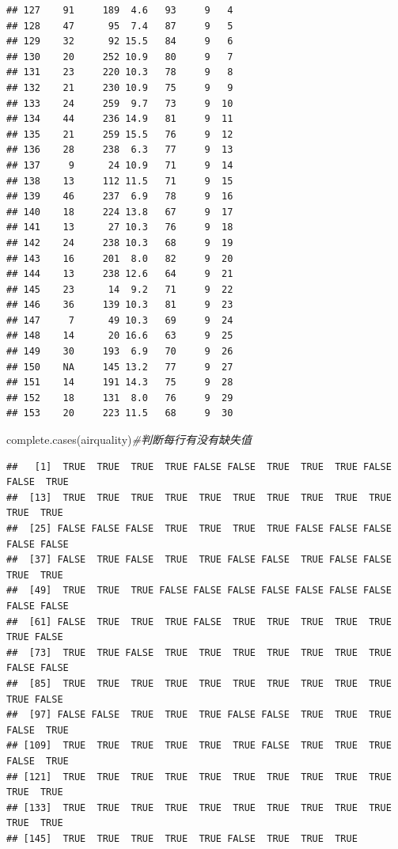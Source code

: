 \documentclass[
]{book}
\newenvironment{Shaded}{\begin{snugshade}}{\end{snugshade}}
\newcommand{\CommentTok}[1]{\textcolor[rgb]{0.56,0.35,0.01}{\textit{#1}}}
\newcommand{\FunctionTok}[1]{\textcolor[rgb]{0.00,0.00,0.00}{#1}}
\newcommand{\NormalTok}[1]{#1}
\begin{document}
\begin{verbatim}
## 127    91     189  4.6   93     9   4
## 128    47      95  7.4   87     9   5
## 129    32      92 15.5   84     9   6
## 130    20     252 10.9   80     9   7
## 131    23     220 10.3   78     9   8
## 132    21     230 10.9   75     9   9
## 133    24     259  9.7   73     9  10
## 134    44     236 14.9   81     9  11
## 135    21     259 15.5   76     9  12
## 136    28     238  6.3   77     9  13
## 137     9      24 10.9   71     9  14
## 138    13     112 11.5   71     9  15
## 139    46     237  6.9   78     9  16
## 140    18     224 13.8   67     9  17
## 141    13      27 10.3   76     9  18
## 142    24     238 10.3   68     9  19
## 143    16     201  8.0   82     9  20
## 144    13     238 12.6   64     9  21
## 145    23      14  9.2   71     9  22
## 146    36     139 10.3   81     9  23
## 147     7      49 10.3   69     9  24
## 148    14      20 16.6   63     9  25
## 149    30     193  6.9   70     9  26
## 150    NA     145 13.2   77     9  27
## 151    14     191 14.3   75     9  28
## 152    18     131  8.0   76     9  29
## 153    20     223 11.5   68     9  30
\end{verbatim}

\begin{Shaded}
\begin{Highlighting}[]
\FunctionTok{complete.cases}\NormalTok{(airquality)}\CommentTok{\#判断每行有没有缺失值}
\end{Highlighting}
\end{Shaded}

\begin{verbatim}
##   [1]  TRUE  TRUE  TRUE  TRUE FALSE FALSE  TRUE  TRUE  TRUE FALSE FALSE  TRUE
##  [13]  TRUE  TRUE  TRUE  TRUE  TRUE  TRUE  TRUE  TRUE  TRUE  TRUE  TRUE  TRUE
##  [25] FALSE FALSE FALSE  TRUE  TRUE  TRUE  TRUE FALSE FALSE FALSE FALSE FALSE
##  [37] FALSE  TRUE FALSE  TRUE  TRUE FALSE FALSE  TRUE FALSE FALSE  TRUE  TRUE
##  [49]  TRUE  TRUE  TRUE FALSE FALSE FALSE FALSE FALSE FALSE FALSE FALSE FALSE
##  [61] FALSE  TRUE  TRUE  TRUE FALSE  TRUE  TRUE  TRUE  TRUE  TRUE  TRUE FALSE
##  [73]  TRUE  TRUE FALSE  TRUE  TRUE  TRUE  TRUE  TRUE  TRUE  TRUE FALSE FALSE
##  [85]  TRUE  TRUE  TRUE  TRUE  TRUE  TRUE  TRUE  TRUE  TRUE  TRUE  TRUE FALSE
##  [97] FALSE FALSE  TRUE  TRUE  TRUE FALSE FALSE  TRUE  TRUE  TRUE FALSE  TRUE
## [109]  TRUE  TRUE  TRUE  TRUE  TRUE  TRUE FALSE  TRUE  TRUE  TRUE FALSE  TRUE
## [121]  TRUE  TRUE  TRUE  TRUE  TRUE  TRUE  TRUE  TRUE  TRUE  TRUE  TRUE  TRUE
## [133]  TRUE  TRUE  TRUE  TRUE  TRUE  TRUE  TRUE  TRUE  TRUE  TRUE  TRUE  TRUE
## [145]  TRUE  TRUE  TRUE  TRUE  TRUE FALSE  TRUE  TRUE  TRUE
\end{verbatim}
\end{document}
